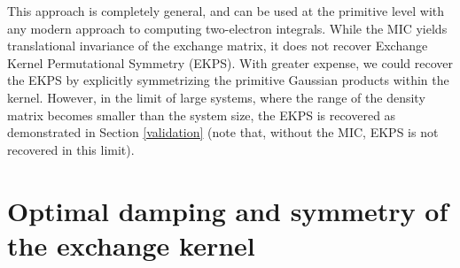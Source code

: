 \commentoutA{\documentclass[prb,aps,nobibnotes,twocolumn,doublespace,twocolumngrid,superbib,showpacs]{revtex4}}
\begin{document}
This approach is completely general, and can be used at the primitive level with any modern approach
to computing two-electron integrals. While the MIC yields translational invariance of the
exchange matrix, it  does not recover Exchange Kernel Permutational Symmetry (EKPS).  With greater 
expense, we could recover the EKPS by  explicitly symmetrizing the primitive Gaussian 
products within the kernel.  However, in the limit of large systems, where the range of the density 
matrix becomes smaller than the system size, the  EKPS is recovered as demonstrated in Section 
\ref{validation} (note that, without the MIC, EKPS is  not recovered in this limit).

\section{Optimal damping and symmetry of the exchange kernel}
\end{document}
